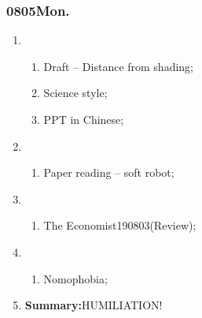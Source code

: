 \subsubsection{0805Mon.}
\begin{enumerate}
	\item \ncquaone
	\begin{enumerate}[(1)]
		\item Draft -- Distance from shading;\rightundoneBlack
		\item Science style;\rightundoneBlack
		\item PPT in Chinese;\rightundoneBlack
	\end{enumerate}
	
	\item \ncquatwo	
	\begin{enumerate}[(1)]
		\item Paper reading -- soft robot;\rightundoneBlack
	\end{enumerate}
	
	\item \ncquathree
	\begin{enumerate}[(1)]
		\item The Economist190803(Review);\rightundoneBlack
	\end{enumerate}
	
	\item \ncquafour	
	\begin{enumerate}[(1)]
		\item Nomophobia;\rightundoneBlack
	\end{enumerate}
	\item \textbf{Summary:}HUMILIATION! 
\end{enumerate}
